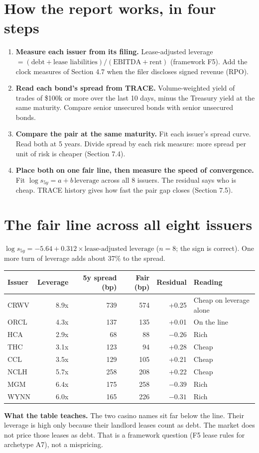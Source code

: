 \documentclass[11pt,a4paper]{article}
\begin{document}
\section{How the report works, in four steps}
\begin{enumerate}
\item \textbf{Measure each issuer from its filing.} Lease-adjusted leverage $=(\text{debt}+\text{lease liabilities})/(\text{EBITDA}+\text{rent})$ (framework F5). Add the clock measures of Section 4.7 when the filer discloses signed revenue (RPO).
\item \textbf{Read each bond's spread from TRACE.} Volume-weighted yield of trades of \$100k or more over the last 10 days, minus the Treasury yield at the same maturity. Compare senior unsecured bonds with senior unsecured bonds.
\item \textbf{Compare the pair at the same maturity.} Fit each issuer's spread curve. Read both at 5 years. Divide spread by each risk measure: more spread per unit of risk is cheaper (Section 7.4).
\item \textbf{Place both on one fair line, then measure the speed of convergence.} Fit $\log s_{5y}=a+b\,\text{leverage}$ across all 8 issuers. The residual says who is cheap. TRACE history gives how fast the pair gap closes (Section 7.5).
\end{enumerate}

\section{The fair line across all eight issuers}
$\log s_{5y} = -5.64 + 0.312\times\text{lease-adjusted leverage}$ ($n=8$; the sign is correct). One more turn of leverage adds about 37\% to the spread.

\begin{center}
\begin{tabular}{@{}lrrrrl@{}}\toprule
Issuer & Leverage & 5y spread (bp) & Fair (bp) & Residual & Reading \\\midrule
CRWV & 8.9x & 739 & 574 & +0.25 & Cheap on leverage alone \\
ORCL & 4.3x & 137 & 135 & +0.01 & On the line \\
HCA & 2.9x & 68 & 88 & $-0.26$ & Rich \\
THC & 3.1x & 123 & 94 & +0.28 & Cheap \\
CCL & 3.5x & 129 & 105 & +0.21 & Cheap \\
NCLH & 5.7x & 258 & 208 & +0.22 & Cheap \\
MGM & 6.4x & 175 & 258 & $-0.39$ & Rich \\
WYNN & 6.0x & 165 & 226 & $-0.31$ & Rich \\\bottomrule
\end{tabular}
\end{center}
\textbf{What the table teaches.} The two casino names sit far below the line. Their leverage is high only because their landlord leases count as debt. The market does not price those leases as debt. That is a framework question (F5 lease rules for archetype A7), not a mispricing.
\end{document}
